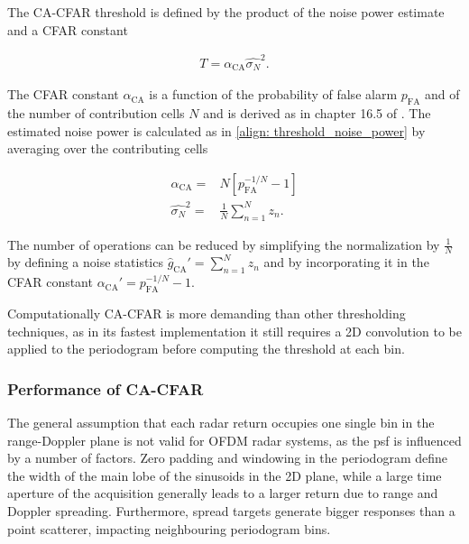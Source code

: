 
The CA-CFAR threshold is defined by the product of the noise power estimate and a CFAR constant

\begin{align*}
	T = \alpha_{\text{CA}} \hat{\sigma_N}^2.
\end{align*}

The CFAR constant $\alpha_{\text{CA}}$ is a function of the probability of false alarm $p_{\text{FA}}$ and of the number of contribution cells $N$ and is derived as in chapter 16.5 of \cite{Richards_Scheer_Holm_2010}. The estimated noise power is calculated as in \ref{align: threshold_noise_power} by averaging over the contributing cells

\begin{align*}
	\alpha_{\text{CA}} =& N[p_{\text{FA}}^{-1/N} - 1] \\
	\hat{\sigma_N}^2 =& \frac{1}{N}\sum_{n=1}^N z_n.
\end{align*}

The number of operations can be reduced by simplifying the normalization by $\frac{1}{N}$ by defining a noise statistics $\hat{g}_{\text{CA}}' = \sum_{n=1}^N z_n$ and by incorporating it in the CFAR constant $\alpha_{\text{CA}}' = p_{\text{FA}}^{-1/N} - 1$.

Computationally CA-CFAR is more demanding than other thresholding techniques, as in its fastest implementation it still requires a 2D convolution to be applied to the periodogram before computing the threshold at each bin.

\subsubsection{Performance of CA-CFAR}

The general assumption that each radar return occupies one single bin in the range-Doppler plane is not valid for OFDM radar systems, as the \gls{psf} is influenced by a number of factors.
Zero padding and windowing in the periodogram define the width of the main lobe of the sinusoids in the 2D plane, while a large time aperture of the acquisition generally leads to a larger return due to range and Doppler spreading.
Furthermore, spread targets generate bigger responses than a point scatterer, impacting neighbouring periodogram bins.

